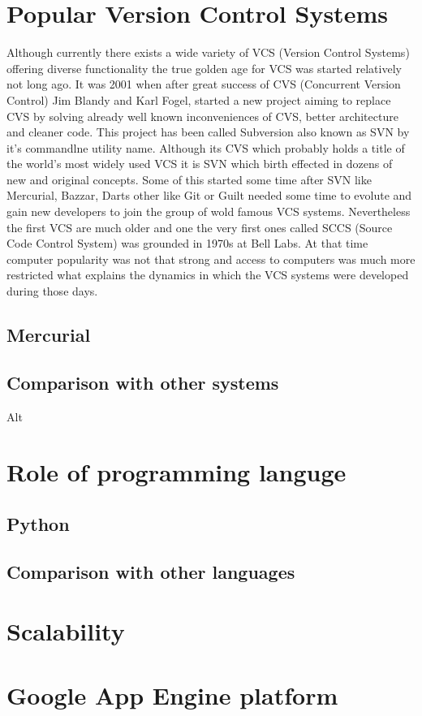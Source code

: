 \section{Popular Version Control Systems}\label{sec:popular_vcs}
Although currently there exists a wide variety of VCS (Version Control Systems) offering diverse functionality the true golden age for VCS was started relatively not long ago. It was 2001 when after great success of CVS (Concurrent Version Control) Jim Blandy and Karl Fogel, started a new project aiming to replace CVS by solving already well known inconveniences of CVS, better architecture and cleaner code\cite{hg_book}. This project has been called Subversion also known as SVN by it's commandlne utility name. Although its CVS which probably holds a title of the world's most widely used VCS it is SVN which birth effected in dozens of new and original concepts. Some of this started some time after SVN like Mercurial, Bazzar, Darts other like Git or Guilt needed some time to evolute and gain new developers to join the group of wold famous VCS systems. Nevertheless the first VCS are much older and one the very first ones called SCCS (Source Code Control System) was grounded in 1970s at Bell Labs. At that time computer popularity was not that strong and access to computers was much more restricted what explains the dynamics in which the VCS systems were developed during those days. 

\subsection{Mercurial}\label{subsec:hg}
\subsection{Comparison with other systems}\label{subsec:dvcs_compare}
Alt
\section{Role of programming languge}\label{sec:language}
\subsection{Python}\label{subsec:py}
\subsection{Comparison with other languages}\label{subsec:lang_compare}
\section{Scalability}\label{sec:scalability}
\section{Google App Engine platform}\label{sec:gae_general}